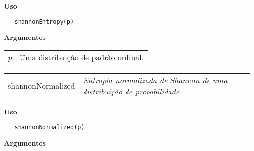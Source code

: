 \documentclass[12pt,letterpaper]{article}
\begin{document}
\vspace{-0.5cm}

\hrulefill  

\vspace{0.5cm}

\textbf{Uso}

\begin{lstlisting}
   shannonEntropy(p)
\end{lstlisting}

\vspace{0.5cm}

\textbf{Argumentos}

\begin{table}[!h]
\begin{center}
\begin{tabularx}{\textwidth}{X X}
\hspace{0.5cm} \textit{p} & Uma distribuição de padrão ordinal.\\
\end{tabularx}
\end{center}
\end{table} 

\newpage

\hrulefill   

\begin{table}[!h]
\begin{center}
\begin{tabularx}{\textwidth}{ X X}
\hspace{0.5cm} shannonNormalized & \textit{Entropia normalizada de Shannon de uma distribuição de probabilidade}\\
\end{tabularx}
\end{center}
\end{table} 

\vspace{-0.5cm}

\hrulefill  

\vspace{0.5cm}

\textbf{Uso}

\begin{lstlisting}
   shannonNormalized(p)
\end{lstlisting}

\vspace{0.5cm}

\textbf{Argumentos}
\end{document}
